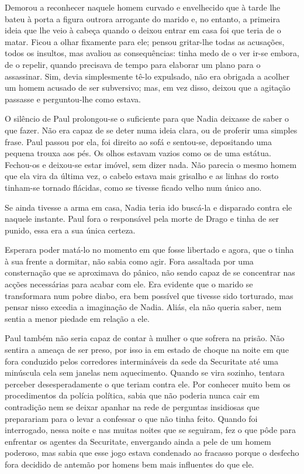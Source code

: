 Demorou a reconhecer naquele homem curvado e envelhecido que à tarde
lhe bateu à porta a figura outrora arrogante do marido e, no entanto, a
primeira ideia que lhe veio à cabeça quando o deixou entrar em casa foi
que teria de o matar. Ficou a olhar fixamente para ele; pensou
gritar-lhe todas as acusações, todos os insultos, mas avaliou as
consequências: tinha medo de o ver ir-se embora, de o repelir, quando
precisava de tempo para elaborar um plano para o assassinar. Sim, devia
simplesmente tê-lo expulsado, não era obrigada a acolher um homem
acusado de ser subversivo; mas, em vez disso, deixou que a agitação
passasse e perguntou-lhe como estava.

O silêncio de Paul prolongou-se o suficiente para que Nadia deixasse de
saber o que fazer. Não era capaz de se deter numa ideia clara, ou de
proferir uma simples frase. Paul passou por ela, foi direito ao sofá e
sentou-se, depositando uma pequena trouxa aos pés. Os olhos estavam
vazios como os de uma estátua. Fechou-os e deixou-se estar imóvel, sem
dizer nada. Não parecia o mesmo homem que ela vira da última vez, o
cabelo estava mais grisalho e as linhas do rosto tinham-se tornado
flácidas, como se tivesse ficado velho num único ano.

Se ainda tivesse a arma em casa, Nadia teria ido buscá-la e disparado contra ele naquele instante. Paul fora o responsável
pela morte de Drago e tinha de ser punido, essa era a sua única certeza.

Esperara poder matá-lo no momento em que fosse libertado e agora, que o
tinha à sua frente a dormitar, não sabia como agir. Fora assaltada por
uma consternação que se aproximava do pânico, não sendo capaz de se
concentrar nas acções necessárias para acabar com ele. Era evidente
que o marido se transformara num pobre diabo, era bem possível que
tivesse sido torturado, mas pensar nisso excedia a imaginação de Nadia.
Aliás, ela não queria saber, nem sentia a menor piedade em relação a
ele.

Paul também não seria capaz de contar à mulher o que sofrera na prisão.
Não sentira a ameaça de ser preso, por isso ia em estado de choque na
noite em que fora conduzido pelos corredores intermináveis da sede da
Securitate até uma minúscula cela sem janelas nem aquecimento. Quando se
vira sozinho, tentara perceber desesperadamente o que teriam contra ele. Por conhecer muito bem os procedimentos
da polícia política, sabia que não poderia nunca cair em contradição nem
se deixar apanhar na rede de perguntas insidiosas que preparariam para o
levar a confessar o que não tinha feito. Quando foi interrogado, nessa
noite e nas muitas noites que se seguiram, fez o que pôde para enfrentar
os agentes da Securitate, envergando ainda a pele de um homem poderoso,
mas sabia que esse jogo estava condenado ao fracasso porque o desfecho
fora decidido de antemão por homens bem mais influentes do que ele.

